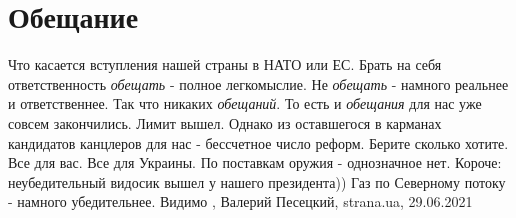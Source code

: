  
 
 
 
 
\chapter{Обещание}

Что касается вступления нашей страны в НАТО или ЕС. Брать на себя
ответственность \emph{обещать} - полное легкомыслие. Не \emph{обещать} - намного реальнее и
ответственнее. Так что никаких \emph{обещаний}. То есть и \emph{обещания} для нас уже совсем
закончились. Лимит вышел. Однако из оставшегося в карманах кандидатов канцлеров
для нас - бессчетное число реформ. Берите сколько хотите. Все для вас. Все для
Украины. По поставкам оружия - однозначное нет. Короче: неубедительный
видосик вышел у нашего президента)) Газ по Северному потоку - намного
убедительнее. Видимо
, 
Валерий Песецкий, strana.ua, 29.06.2021

